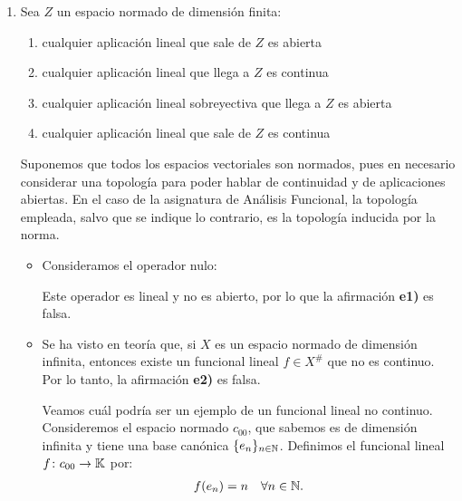 \documentclass[12pt]{article}
\begin{document}
\begin{ejercicio}
\begin{enumerate}[label=\alph*)]
            Por ejemplo, en $X = \mathbb{R}^2$ con la norma euclídea, consideremos el conjunto convexo y cerrado $C = \{(0,0)\}$ y el punto $x_0 = (1,0) \notin C$. Los siguientes dos funcionales distintos $f_1, f_2 \in (\mathbb{R}^2)^*$, ambos de norma $1$, separan $C$ de $x_0$:
            \begin{align*}
                f_1(x,y) &= x \quad \Longrightarrow \quad \sup f_1(C) = 0 < 1 = f_1(x_0), \\
                f_2(x,y) &= \frac{1}{\sqrt{2}}(x+y) \quad \Longrightarrow \quad \sup f_2(C) = 0 < \frac{1}{\sqrt{2}} = f_2(x_0).
            \end{align*}
            \item Sea $Z$ un espacio normado de dimensión finita:
            \begin{enumerate}[label={e\arabic*)}]
                \item cualquier aplicación lineal que sale de $Z$ es abierta
                \item cualquier aplicación lineal que llega a $Z$ es continua
                \item cualquier aplicación lineal sobreyectiva que llega a $Z$ es abierta
                \item cualquier aplicación lineal que sale de $Z$ es continua
            \end{enumerate}

            Suponemos que todos los espacios vectoriales son normados, pues en necesario considerar una topología para poder hablar de continuidad y de aplicaciones abiertas. En el caso de la asignatura de Análisis Funcional, la topología empleada, salvo que se indique lo contrario, es la topología inducida por la norma.
            \begin{itemize}
                \item Consideramos el operador nulo:

                Este operador es lineal y no es abierto, por lo que la afirmación \textbf{e1)} es falsa.

                \item Se ha visto en teoría que, si $X$ es un espacio normado de dimensión infinita, entonces existe un funcional lineal $f \in X^{\#}$ que no es continuo. Por lo tanto, la afirmación \textbf{e2)} es falsa.
                
                Veamos cuál podría ser un ejemplo de un funcional lineal no continuo. Consideremos el espacio normado $c_{00}$, que sabemos es de dimensión infinita y tiene una base canónica $\{e_n\}_{n \in \mathbb{N}}$. Definimos el funcional lineal $f \colon c_{00} \to \mathbb{K}$ por:
                \begin{align*}
                    f(e_n) = n \quad \forall n \in \mathbb{N}.
                \end{align*}


\end{itemize}
\end{enumerate}
\end{ejercicio}
\end{document}
